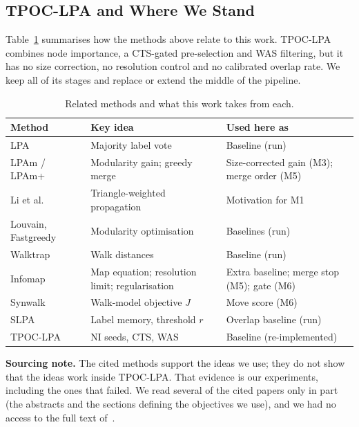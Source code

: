 \documentclass[conference]{IEEEtran}
\begin{document}
\subsection{TPOC-LPA and Where We Stand}
Table~\ref{tab:related} summarises how the methods above relate to this work. TPOC-LPA~\cite{kong2026} combines node importance, a CTS-gated pre-selection and WAS filtering, but it has no size correction, no resolution control and no calibrated overlap rate. We keep all of its stages and replace or extend the middle of the pipeline.
\begin{table}[H]
\centering
\caption{Related methods and what this work takes from each.}
\label{tab:related}
\scriptsize
\begin{tabular}{>{\raggedright\arraybackslash}p{19mm}>{\raggedright\arraybackslash}p{26mm}>{\raggedright\arraybackslash}p{29mm}}
\toprule
Method & Key idea & Used here as \\
\midrule
LPA~\cite{raghavan2007} & Majority label vote & Baseline (run) \\
LPAm / LPAm+~\cite{barber2009,liu2010} & Modularity gain; greedy merge & Size-corrected gain (M3); merge order (M5) \\
Li et al.~\cite{li2020motif} & Triangle-weighted propagation & Motivation for M1 \\
Louvain, Fastgreedy~\cite{blondel2008,clauset2004} & Modularity optimisation & Baselines (run) \\
Walktrap~\cite{pons2006} & Walk distances & Baseline (run) \\
Infomap~\cite{rosvall2008,kawamoto2015,smiljanic2020} & Map equation; resolution limit; regularisation & Extra baseline; merge stop (M5); gate (M6) \\
Synwalk~\cite{toth2022} & Walk-model objective $J$ & Move score (M6) \\
SLPA~\cite{xie2011} & Label memory, threshold $r$ & Overlap baseline (run) \\
TPOC-LPA~\cite{kong2026} & NI seeds, CTS, WAS & Baseline (re-implemented) \\
\bottomrule
\end{tabular}
\end{table}
\textbf{Sourcing note.} The cited methods support the ideas we use; they do not show that the ideas work inside TPOC-LPA. That evidence is our experiments, including the ones that failed. We read several of the cited papers only in part (the abstracts and the sections defining the objectives we use), and we had no access to the full text of~\cite{li2020motif}.
\end{document}
